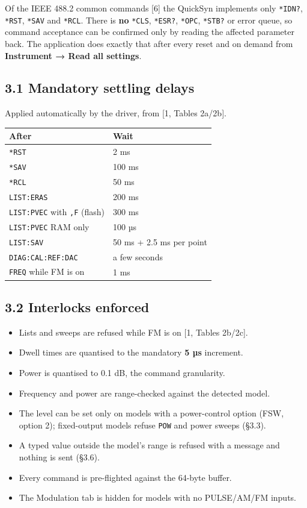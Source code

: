 \documentclass[
\directlua{luaotfload.add_fallback("qsfallback", {"DejaVu Sans:mode=harf;", "DejaVu Sans Mono:mode=harf;", "DejaVu Math TeX Gyre:mode=harf;"})}
  10pt,
  letterpaper,
]{article}
\providecommand{\tightlist}{%
  \setlength{\itemsep}{0pt}\setlength{\parskip}{0pt}}
\begin{document}
Of the IEEE 488.2 common commands {[}6{]} the QuickSyn implements only
\texttt{*IDN?}, \texttt{*RST}, \texttt{*SAV} and \texttt{*RCL}. There is
\textbf{no} \texttt{*CLS}, \texttt{*ESR?}, \texttt{*OPC}, \texttt{*STB?}
or error queue, so command acceptance can be confirmed only by reading
the affected parameter back. The application does exactly that after
every reset and on demand from \textbf{Instrument → Read all settings}.

\hypertarget{mandatory-settling-delays}{%
\subsection{3.1 Mandatory settling
delays}\label{mandatory-settling-delays}}

Applied automatically by the driver, from {[}1, Tables 2a/2b{]}.

\begin{longtable}[]{@{}ll@{}}
\toprule\noalign{}
After & Wait \\
\midrule\noalign{}
\endhead
\bottomrule\noalign{}
\endlastfoot
\texttt{*RST} & 2 ms \\
\texttt{*SAV} & 100 ms \\
\texttt{*RCL} & 50 ms \\
\texttt{LIST:ERAS} & 200 ms \\
\texttt{LIST:PVEC} with \texttt{,F} (flash) & 300 ms \\
\texttt{LIST:PVEC} RAM only & 100 µs \\
\texttt{LIST:SAV} & 50 ms + 2.5 ms per point \\
\texttt{DIAG:CAL:REF:DAC} & a few seconds \\
\texttt{FREQ} while FM is on & 1 ms \\
\end{longtable}

\hypertarget{interlocks-enforced}{%
\subsection{3.2 Interlocks enforced}\label{interlocks-enforced}}

\begin{itemize}
\tightlist
\item
  Lists and sweeps are refused while FM is on {[}1, Tables 2b/2c{]}.
\item
  Dwell times are quantised to the mandatory \textbf{5 µs} increment.
\item
  Power is quantised to 0.1 dB, the command granularity.
\item
  Frequency and power are range-checked against the detected model.
\item
  The level can be set only on models with a power-control option (FSW,
  option 2); fixed-output models refuse \texttt{POW} and power sweeps
  (§3.3).
\item
  A typed value outside the model's range is refused with a message and
  nothing is sent (§3.6).
\item
  Every command is pre-flighted against the 64-byte buffer.
\item
  The Modulation tab is hidden for models with no PULSE/AM/FM inputs.
\end{itemize}
\end{document}
